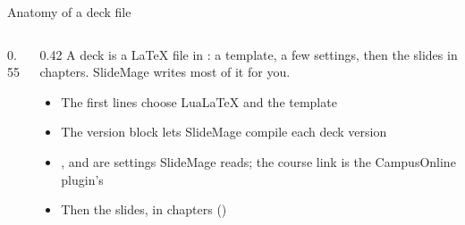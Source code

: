 
\begin{standardframe}{Anatomy of a deck file}
	\begin{columns}[T,onlytextwidth]
		\begin{column}{0.55\linewidth}
		\end{column}
		\begin{column}{0.42\linewidth}
			\small
			A deck is a LaTeX file in : a template, a few settings,
			then the slides in chapters. SlideMage writes most of it for you.
			\par\medskip
			\begin{itemize}
				\item The first lines choose LuaLaTeX and the template
				\item The version block lets SlideMage compile each deck version
				\item {},  and  are settings SlideMage reads; the course link is the CampusOnline plugin's
				\item Then the slides, in chapters ()
			\end{itemize}
		\end{column}
	\end{columns}
\end{standardframe}
